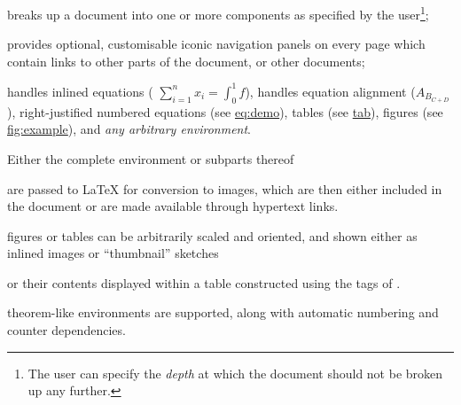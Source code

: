 \begin{itemize}
\item
breaks up a document into one or more components as specified
by the user\footnote{The user can specify the \emph{depth} at which
the document should not be broken up any further.};

%
\item
provides optional, customisable iconic navigation
panels on every page which contain links to other parts of the
document, or other documents;

%
%
%
\item
handles inlined equations ( \(\sum_{i=1}^{n} x_{i} = \int_{0}^{1} f \)),
handles equation alignment ($A_{B_{C+D}}$),
right-justified numbered equations (see \hyperref{example}{equation~}{}{eq:demo}),
tables (see \hyperref{example}{Table~}{}{tab}),
figures (see \hyperref{example}{Figure~}{}{fig:example}),
and \emph{any arbitrary environment}.
\begin{changebar}%
Either the complete environment or subparts thereof\html{\dots}
\end{changebar}%
are passed to \LaTeX{}  for conversion to images, which are then either included
in the document or are made available through hypertext links.

%
%
%
\begin{changebar}%
\item
figures or tables can be arbitrarily scaled and oriented,
and shown either as inlined images or ``thumbnail'' sketches\html{\dots}
\begin{changebar}
or their contents displayed within a table constructed
using the  tags of \HTMLiii.
\end{changebar}\end{changebar}

%
%
%
%
\begin{changebar}
\item
theorem-like environments are supported, along with
automatic numbering and counter dependencies.
\end{changebar}%


\end{itemize}

